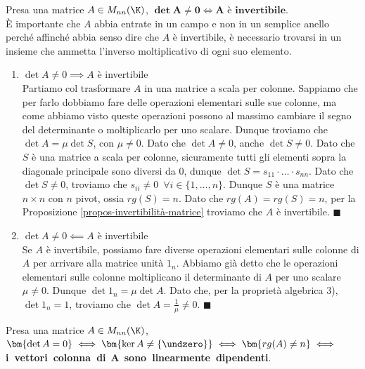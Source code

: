 \documentclass[11pt, a4paper, titlepage, oneside]{scrbook}
\begin{document}
\begin{Osservazione}[]
\label{oss-det diverso da 0 A invertibile}
Presa una matrice $A \in M_{nn}(\K)$, $\bm{\det A \neq 0} \iff \bm{A} \textbf{ è invertibile}$. \\
\NB È importante che $A$ abbia entrate in un campo e non in un semplice anello perché affinché abbia senso dire che $A$ è invertibile, è necessario trovarsi in un insieme che ammetta l'inverso moltiplicativo di ogni suo elemento. 
\end{Osservazione}

\Dimostrazione \nopagebreak

\begin{enumerate}[label=\arabic*°]
    \item $\det A \neq 0 \implies A$ è invertibile \\
    Partiamo col trasformare $A$ in una matrice a scala per colonne. Sappiamo che per farlo dobbiamo fare delle operazioni elementari sulle sue colonne, ma come abbiamo visto queste operazioni possono al massimo cambiare il segno del determinante o moltiplicarlo per uno scalare. Dunque troviamo che $\det A = \mu \det S$, con $\mu \neq 0$. Dato che $\det A \neq 0$, anche $\det S \neq 0$. Dato che $S$ è una matrice a scala per colonne, sicuramente tutti gli elementi sopra la diagonale principale sono diversi da $0$, dunque $\det S = s_{11} \cdot \ldots \cdot s_{nn}$. Dato che $\det S \neq 0$, troviamo che $s_{ii} \neq 0 \enspace \forall i \in \{1, \ldots, n\}$. Dunque $S$ è una matrice $n \times n$ con $n$ pivot, ossia $rg(S) = n$. Dato che $rg(A) = rg(S) = n$, per la Proposizione \ref{propos-invertibilità-matrice} troviamo che $A$ è invertibile. $\blacksquare$
    \item $\det A \neq 0 \impliedby A$ è invertibile \\
    Se $A$ è invertibile, possiamo fare diverse operazioni elementari sulle colonne di $A$ per arrivare alla matrice unità $1_n$. Abbiamo già detto che le operazioni elementari sulle colonne moltiplicano il determinante di $A$ per uno scalare $\mu \neq 0$. Dunque $\det 1_n = \mu \det A$. Dato che, per la proprietà algebrica 3), $\det 1_n = 1$, troviamo che $\det A = \frac{1}{\mu} \neq 0$. $\blacksquare$
\end{enumerate}

\begin{Proposizione}[Corollario]
\label{corol-det-invertibilita}
Presa una matrice $A \in M_{nn}(\K)$, $\bm{\det A = 0} \iff \bm{\ker A \neq \{\undzero\}} \iff \bm{rg(A) \neq n} \iff$ \mbox{\textbf{i vettori colonna di} $\bm{A}$ \textbf{sono linearmente dipendenti}}.
\end{Proposizione}
\end{document}
